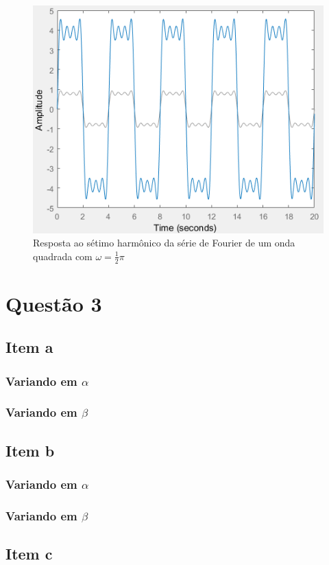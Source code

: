 \documentclass[a4paper, 12pt]{article}
\begin{document}
			\begin{figure}[!ht]
				\centering
				\includegraphics[scale=0.71]{img/2l.png}
				\caption{Resposta ao sétimo harmônico da série de Fourier de um onda quadrada com $\omega = \frac{1}{2}\pi$}	
			\end{figure}							
	\section{Quest\~{a}o 3}
		\subsection{Item a}
			\subsubsection{Variando em $\alpha$}
			\subsubsection{Variando em $\beta$}
		\subsection{Item b}	
			\subsubsection{Variando em $\alpha$}
			\subsubsection{Variando em $\beta$}			
		\subsection{Item c}		
\end{document}
